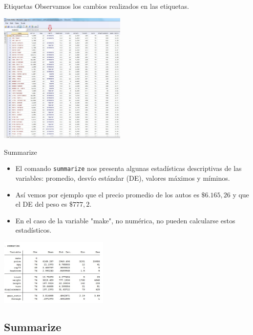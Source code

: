 \documentclass{beamer}
\begin{document}
\begin{frame}[allowframebreaks]{Etiquetas}
{\footnotesize Observamos los cambios realizados en las etiquetas.}\\
\centerline{\includegraphics[height=6.5cm]{label1.jpg}}
\end{frame}


\begin{frame}{Summarize}
\begin{itemize}
\item El comando \texttt{summarize} nos presenta algunas estadísticas descriptivas de las variables: promedio, desvío estándar (DE), valores máximos y míminos. 
\item Así vemos por ejemplo que el precio promedio de los autos es $\$6.165,26$ y que el DE del peso es $\$777,2$.
\item En el caso de la variable "make", no numérica, no pueden calcularse estos estadísticos.
\end{itemize}
\centerline{\includegraphics[height=3.3cm]{summerize.jpg}}
\end{frame}

\subsection{Summarize}
\end{document}
